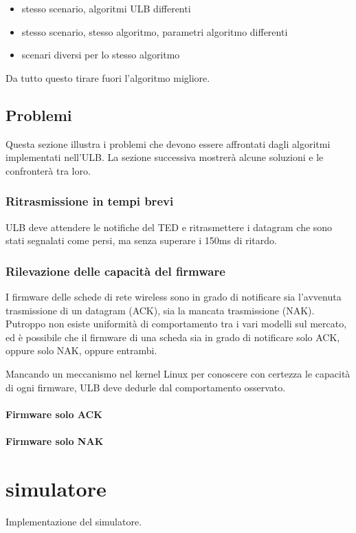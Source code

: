 \documentclass[12pt,a4paper,openright,twoside]{book}
\begin{document}
\begin{itemize}
\item stesso scenario, algoritmi ULB differenti
\item stesso scenario, stesso algoritmo, parametri algoritmo differenti
\item scenari diversi per lo stesso algoritmo
\end{itemize}

Da tutto questo tirare fuori l'algoritmo migliore.

\section{Problemi}
Questa sezione illustra i problemi che devono essere affrontati dagli
algoritmi implementati nell'ULB. La sezione successiva mostrerà alcune
soluzioni e le confronterà tra loro.

\subsection{Ritrasmissione in tempi brevi}
ULB deve attendere le notifiche del TED e ritrasmettere i datagram che
sono stati segnalati come persi, ma senza superare i 150ms di ritardo.

\subsection{Rilevazione delle capacità del firmware}
I firmware delle schede di rete wireless sono in grado di notificare
sia l'avvenuta trasmissione di un datagram (ACK), sia la mancata
trasmissione (NAK). Putroppo non esiste uniformità di comportamento
tra i vari modelli sul mercato, ed è possibile che il firmware di una
scheda sia in grado di notificare solo ACK, oppure solo NAK, oppure
entrambi.

Mancando un meccanismo nel kernel Linux per conoscere con certezza le
capacità di ogni firmware, ULB deve dedurle dal comportamento
osservato.

\subsubsection{Firmware solo ACK}


\subsubsection{Firmware solo NAK}

\chapter{simulatore}
Implementazione del simulatore.
\end{document}
